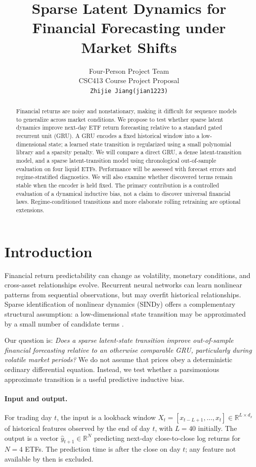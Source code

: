 \documentclass{article}
\title{Sparse Latent Dynamics for Financial Forecasting under Market Shifts}
\author{%
  Four-Person Project Team \\
  CSC413 Course Project Proposal \\
  \texttt{Zhijie Jiang(jian1223)}
}
\begin{document}
\maketitle

\begin{abstract}
Financial returns are noisy and nonstationary, making it difficult for sequence models to generalize across market conditions. We propose to test whether sparse latent dynamics improve next-day ETF return forecasting relative to a standard gated recurrent unit (GRU). A GRU encodes a fixed historical window into a low-dimensional state; a learned state transition is regularized using a small polynomial library and a sparsity penalty. We will compare a direct GRU, a dense latent-transition model, and a sparse latent-transition model using chronological out-of-sample evaluation on four liquid ETFs. Performance will be assessed with forecast errors and regime-stratified diagnostics. We will also examine whether discovered terms remain stable when the encoder is held fixed. The primary contribution is a controlled evaluation of a dynamical inductive bias, not a claim to discover universal financial laws. Regime-conditioned transitions and more elaborate rolling retraining are optional extensions.
\end{abstract}

\section{Introduction}
Financial return predictability can change as volatility, monetary conditions, and cross-asset relationships evolve. Recurrent neural networks can learn nonlinear patterns from sequential observations, but may overfit historical relationships. Sparse identification of nonlinear dynamics (SINDy) offers a complementary structural assumption: a low-dimensional state transition may be approximated by a small number of candidate terms \citep{brunton2016}.

Our question is: \emph{Does a sparse latent-state transition improve out-of-sample financial forecasting relative to an otherwise comparable GRU, particularly during volatile market periods?} We do not assume that prices obey a deterministic ordinary differential equation. Instead, we test whether a parsimonious approximate transition is a useful predictive inductive bias.

\paragraph{Input and output.}
For trading day $t$, the input is a lookback window $X_t=[x_{t-L+1},\ldots,x_t]\in\mathbb{R}^{L\times d_x}$ of historical features observed by the end of day $t$, with $L=40$ initially. The output is a vector $\hat y_{t+1}\in\mathbb{R}^{N}$ predicting next-day close-to-close log returns for $N=4$ ETFs. The prediction time is after the close on day $t$; any feature not available by then is excluded.
\end{document}
